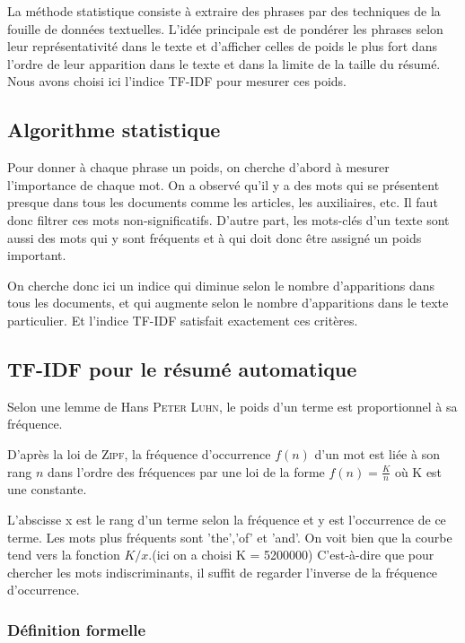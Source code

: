 \documentclass[a4paper, 12pt]{article}
\begin{document}
La méthode statistique consiste à extraire des phrases par des techniques de la fouille de données textuelles. L'idée principale est de pondérer les phrases selon leur représentativité dans le texte et d'afficher celles de poids le plus fort dans l'ordre de leur apparition dans le texte et dans la limite de la taille du résumé. Nous avons choisi ici l'indice TF-IDF pour mesurer ces poids.

\subsection{Algorithme statistique}

Pour donner à chaque phrase un poids, on cherche d'abord à mesurer l'importance de chaque mot. On a observé qu'il y a des mots qui se présentent presque dans tous les documents comme les articles, les auxiliaires, etc. Il faut donc filtrer ces mots non-significatifs. D'autre part, les mots-clés d'un texte sont aussi des mots qui y sont fréquents et à qui doit donc être assigné un poids important.

On cherche donc ici un indice qui diminue selon le nombre d'apparitions dans tous les documents, et qui augmente selon le nombre d'apparitions dans le texte particulier. Et l'indice TF-IDF satisfait exactement ces critères.


\subsection{TF-IDF pour le résumé automatique}
Selon une lemme de Hans \textsc{Peter Luhn}, le poids d'un terme est proportionnel à sa fréquence.

D'après la loi de \textsc{Zipf}, la fréquence d'occurrence $f(n)$ d'un mot est liée à son rang $n$ dans l'ordre des fréquences par une loi de la forme $f(n) = \frac{K}{n} $ où K est une constante.


L'abscisse x est le rang d'un terme selon la fréquence et y est l'occurrence de ce terme. Les mots plus fréquents sont 'the','of' et 'and'. On voit bien que la courbe tend vers la fonction $K/x$.(ici on a choisi K = 5200000) C'est-à-dire que pour chercher les mots indiscriminants, il suffit de regarder l'inverse de la fréquence d'occurrence.

\subsubsection{Définition formelle}
\end{document}
